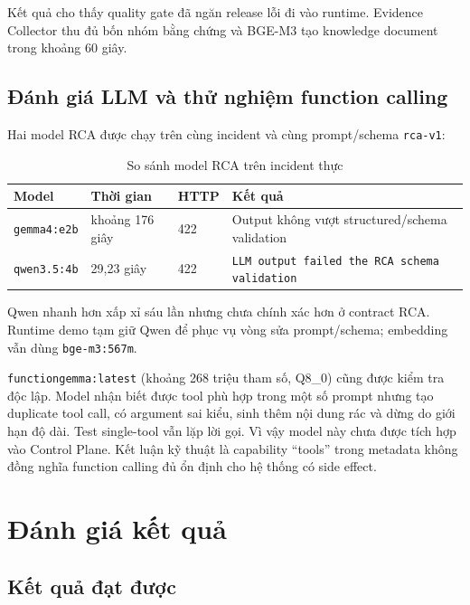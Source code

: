 \documentclass[12pt,a4paper,oneside]{report}
\newcommand{\code}[1]{\texttt{#1}}
\begin{document}
Kết quả cho thấy quality gate đã ngăn release lỗi đi vào runtime. Evidence Collector thu đủ bốn
nhóm bằng chứng và BGE-M3 tạo knowledge document trong khoảng 60 giây.

\section{Đánh giá LLM và thử nghiệm function calling}

Hai model RCA được chạy trên cùng incident và cùng prompt/schema \code{rca-v1}:

\begin{table}[H]
\centering
\caption{So sánh model RCA trên incident thực}
\label{tab:models}
\begin{tabularx}{\textwidth}{L{3.2cm} C{2.8cm} C{1.8cm} Y}
\toprule
\textbf{Model} & \textbf{Thời gian} & \textbf{HTTP} & \textbf{Kết quả} \\
\midrule
\code{gemma4:e2b} & khoảng 176 giây & 422 & Output không vượt structured/schema validation \\
\code{qwen3.5:4b} & 29,23 giây & 422 & \code{LLM output failed the RCA schema validation} \\
\bottomrule
\end{tabularx}
\end{table}

Qwen nhanh hơn xấp xỉ sáu lần nhưng chưa chính xác hơn ở contract RCA. Runtime demo tạm giữ Qwen
để phục vụ vòng sửa prompt/schema; embedding vẫn dùng \code{bge-m3:567m}.

\code{functiongemma:latest} (khoảng 268 triệu tham số, Q8\_0) cũng được kiểm tra độc lập. Model
nhận biết được tool phù hợp trong một số prompt nhưng tạo duplicate tool call, có argument sai kiểu,
sinh thêm nội dung rác và dừng do giới hạn độ dài. Test single-tool vẫn lặp lời gọi. Vì vậy model
này chưa được tích hợp vào Control Plane. Kết luận kỹ thuật là capability ``tools'' trong metadata
không đồng nghĩa function calling đủ ổn định cho hệ thống có side effect.

\chapter{Đánh giá kết quả}

\section{Kết quả đạt được}
\end{document}
